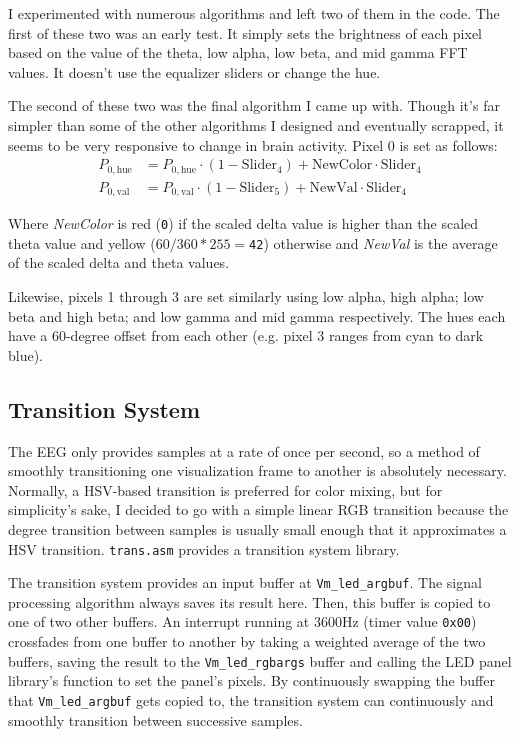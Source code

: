 \documentclass[letterpaper,10pt,notitlepage]{report}
\newcommand{\dat}[1]{\texttt{#1}}
\begin{document}
        I experimented with numerous algorithms and left two of them in the
        code.  The first of these two was an early test.  It simply sets the
        brightness of each pixel based on the value of the theta, low alpha,
        low beta, and mid gamma FFT values.  It doesn't use the equalizer
        sliders or change the hue.

        The second of these two was the final algorithm I came up with.  Though
        it's far simpler than some of the other algorithms I designed and
        eventually scrapped, it seems to be very responsive to change in brain
        activity.  Pixel 0 is set as follows:
        \begin{align}
            P_{0,\textrm{hue}} &= P_{0,\textrm{hue}} \cdot
                (1-\textrm{Slider}_4) + \textrm{NewColor} \cdot \textrm{Slider}_4  \\
            P_{0,\textrm{val}} &= P_{0,\textrm{val}} \cdot
                (1-\textrm{Slider}_5) + \textrm{NewVal} \cdot \textrm{Slider}_4
        \end{align}

        Where \emph{NewColor} is red (\dat{0}) if the scaled delta value is
        higher than the scaled theta value and yellow ($60/360*255=$\dat{42})
        otherwise and \emph{NewVal} is the average of the scaled delta and
        theta values.

        Likewise, pixels 1 through 3 are set similarly using low alpha, high
        alpha; low beta and high beta; and low gamma and mid gamma
        respectively.  The hues each have a 60-degree offset from each other
        (e.g. pixel 3 ranges from cyan to dark blue).
        
    \subsection{Transition System}

        The EEG only provides samples at a rate of once per second, so a method
        of smoothly transitioning one visualization frame to another is
        absolutely necessary.  Normally, a HSV-based transition is preferred
        for color mixing, but for simplicity's sake, I decided to go with a
        simple linear RGB transition because the degree transition between
        samples is usually small enough that it approximates a HSV transition.
        \dat{trans.asm} provides a transition system library.

        The transition system provides an input buffer at
        \dat{Vm\_led\_argbuf}.  The signal processing algorithm always saves
        its result here.  Then, this buffer is copied to one of two other
        buffers.  An interrupt running at 3600Hz (timer value \dat{0x00})
        crossfades from one buffer to another by taking a weighted average of
        the two buffers, saving the result to the \dat{Vm\_led\_rgbargs}
        buffer and calling the LED panel library's function to set the panel's
        pixels.  By continuously swapping the buffer that
        \dat{Vm\_led\_argbuf} gets copied to, the transition system can
        continuously and smoothly transition between successive samples.
\end{document}
